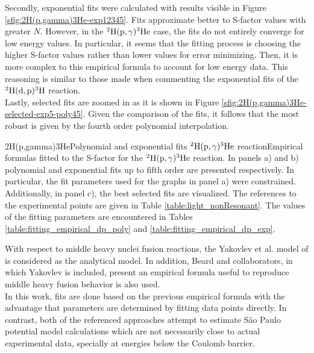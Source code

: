 \documentclass[openany]{book}
\begin{document}
Secondly, exponential fits were calculated with results visible in Figure \ref{sfig:2H(p,gamma)3He-exp12345}. Fits approximate better to S-factor values with greater $N$. However,  in the $\mathrm{{}^{2}H(p, \gamma){}^{3}He}$ case, the fits do not entirely converge for low energy values. In particular, it seems that the fitting process is choosing the higher S-factor values rather than lower values for error minimizing. Then, it is more complex to this empirical formula to account for low energy data. This reasoning is similar to those made when commenting the exponential fits of the $\mathrm{{}^{2}H(d, p){}^{3}H}$ reaction. \\

Lastly, selected fits are zoomed in as it is shown in Figure \ref{sfig:2H(p,gamma)3He-selected-exp5-poly45}. Given the comparison of the fits, it follows that the most robust is given by the fourth order polynomial interpolation.


{2H(p,gamma)3He}{Polynomial and exponential fits $\mathrm{{}^{2}H(p, \gamma){}^{3}He}$ reaction}{Empirical formulas fitted to the S-factor for the $\mathrm{{}^{2}H(p, \gamma){}^{3}He}$ reaction. In panels a) and b) polynomial and exponential fits up to fifth order are presented respectively.  In particular, the fit parameters used for the graphs in panel a) were constrained. Additionally, in panel c), the best selected fits are visualized. The references to the experimental points are given in Table \ref{table:light_nonResonant}. The values of the fitting parameters are encountered in Tables \ref{table:fitting_empirical_dp_poly} and \ref{table:fitting_empirical_dp_exp}.}


With respect to middle heavy nuclei fusion reactions, the Yakovlev et al. model of \cite{yakovlev_beard_gasques_wiescher_2010} is considered as the analytical model. In addition, Beard and collaborators, in which Yakovlev is included, present an empirical formula useful to reproduce middle heavy fusion behavior \cite{beard_afanasjev_chamon_gasques_wiescher_yakovlev_2010} is also used. \\

In this work, fits are done based on the previous empirical formula  with the advantage that parameters are determined by fitting data points directly. In contrast, both of the referenced approaches attempt to estimate São Paulo potential model calculations which are not necessarily close to actual experimental data, specially at energies below the Coulomb barrier. \\
\end{document}
